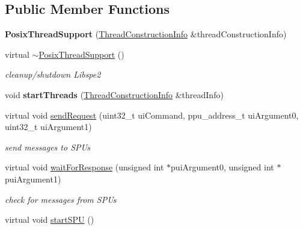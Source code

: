 \subsection*{Public Member Functions}
\begin{DoxyCompactItemize}
\item 
\hypertarget{class_posix_thread_support_a6b82e5cd33a67247d6ce7dd2c9c1be17}{{\bfseries Posix\+Thread\+Support} (\hyperlink{struct_posix_thread_support_1_1_thread_construction_info}{Thread\+Construction\+Info} \&thread\+Construction\+Info)}\label{class_posix_thread_support_a6b82e5cd33a67247d6ce7dd2c9c1be17}

\item 
\hypertarget{class_posix_thread_support_aa1ba225967d704b9485eb636b28d670a}{virtual \hyperlink{class_posix_thread_support_aa1ba225967d704b9485eb636b28d670a}{$\sim$\+Posix\+Thread\+Support} ()}\label{class_posix_thread_support_aa1ba225967d704b9485eb636b28d670a}

\begin{DoxyCompactList}\small\item\em cleanup/shutdown Libspe2 \end{DoxyCompactList}\item 
\hypertarget{class_posix_thread_support_a4afd23caaba58363c15c578157d364ba}{void {\bfseries start\+Threads} (\hyperlink{struct_posix_thread_support_1_1_thread_construction_info}{Thread\+Construction\+Info} \&thread\+Info)}\label{class_posix_thread_support_a4afd23caaba58363c15c578157d364ba}

\item 
virtual void \hyperlink{class_posix_thread_support_ab67534f720c0405821ea89cf05dd6b0f}{send\+Request} (uint32\+\_\+t ui\+Command, ppu\+\_\+address\+\_\+t ui\+Argument0, uint32\+\_\+t ui\+Argument1)
\begin{DoxyCompactList}\small\item\em send messages to S\+P\+Us \end{DoxyCompactList}\item 
virtual void \hyperlink{class_posix_thread_support_a65bf7f0f96518d97f781b0559495f91d}{wait\+For\+Response} (unsigned int $\ast$pui\+Argument0, unsigned int $\ast$pui\+Argument1)
\begin{DoxyCompactList}\small\item\em check for messages from S\+P\+Us \end{DoxyCompactList}\item 
\hypertarget{class_posix_thread_support_a937bbc2c359429b0f0c1d9514ab150eb}{virtual void \hyperlink{class_posix_thread_support_a937bbc2c359429b0f0c1d9514ab150eb}{start\+S\+P\+U} ()}\label{class_posix_thread_support_a937bbc2c359429b0f0c1d9514ab150eb}


\end{DoxyCompactItemize}
